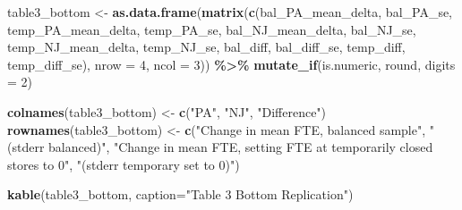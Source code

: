 \documentclass[
]{article}
\newenvironment{Shaded}{\begin{snugshade}}{\end{snugshade}}
\newcommand{\AttributeTok}[1]{\textcolor[rgb]{0.13,0.29,0.53}{#1}}
\newcommand{\DecValTok}[1]{\textcolor[rgb]{0.00,0.00,0.81}{#1}}
\newcommand{\FunctionTok}[1]{\textcolor[rgb]{0.13,0.29,0.53}{\textbf{#1}}}
\newcommand{\NormalTok}[1]{#1}
\newcommand{\OtherTok}[1]{\textcolor[rgb]{0.56,0.35,0.01}{#1}}
\newcommand{\SpecialCharTok}[1]{\textcolor[rgb]{0.81,0.36,0.00}{\textbf{#1}}}
\newcommand{\StringTok}[1]{\textcolor[rgb]{0.31,0.60,0.02}{#1}}
\begin{document}
\begin{Shaded}
\begin{Highlighting}[]
\NormalTok{table3\_bottom }\OtherTok{\textless{}{-}} \FunctionTok{as.data.frame}\NormalTok{(}\FunctionTok{matrix}\NormalTok{(}\FunctionTok{c}\NormalTok{(bal\_PA\_mean\_delta, bal\_PA\_se,}
\NormalTok{                                 temp\_PA\_mean\_delta, temp\_PA\_se,}
\NormalTok{                                 bal\_NJ\_mean\_delta, bal\_NJ\_se,}
\NormalTok{                                 temp\_NJ\_mean\_delta, temp\_NJ\_se,}
\NormalTok{                                 bal\_diff, bal\_diff\_se,}
\NormalTok{                                 temp\_diff, temp\_diff\_se),}
                         \AttributeTok{nrow =} \DecValTok{4}\NormalTok{, }\AttributeTok{ncol =} \DecValTok{3}\NormalTok{)) }\SpecialCharTok{\%\textgreater{}\%} 
  \FunctionTok{mutate\_if}\NormalTok{(is.numeric, round, }\AttributeTok{digits =} \DecValTok{2}\NormalTok{)}

\FunctionTok{colnames}\NormalTok{(table3\_bottom) }\OtherTok{\textless{}{-}} \FunctionTok{c}\NormalTok{(}\StringTok{"PA"}\NormalTok{, }\StringTok{"NJ"}\NormalTok{, }\StringTok{"Difference"}\NormalTok{)}
\FunctionTok{rownames}\NormalTok{(table3\_bottom) }\OtherTok{\textless{}{-}} \FunctionTok{c}\NormalTok{(}\StringTok{"Change in mean FTE, balanced sample"}\NormalTok{, }\StringTok{"(stderr balanced)"}\NormalTok{, }\StringTok{"Change in mean FTE, setting FTE at temporarily closed stores to 0"}\NormalTok{, }\StringTok{"(stderr temporary set to 0)"}\NormalTok{)}

\FunctionTok{kable}\NormalTok{(table3\_bottom, }\AttributeTok{caption=}\StringTok{"Table 3 Bottom Replication"}\NormalTok{)}
\end{Highlighting}
\end{Shaded}
\end{document}
